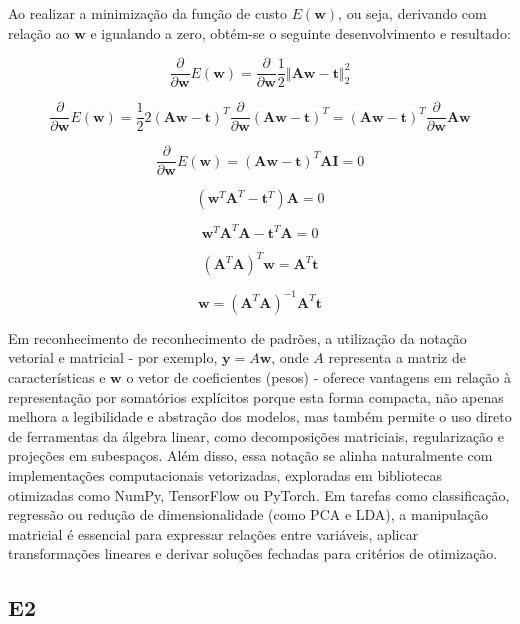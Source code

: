 \documentclass{article}
\begin{document}
  Ao realizar a minimização da função de custo $E(\mathbf{w})$, ou seja, derivando com relação ao $\mathbf{w}$ e igualando a zero, obtém-se o seguinte desenvolvimento e resultado:
  
  \[
   \frac{\partial}{\partial \mathbf{w}} E(\mathbf{w}) =  \frac{\partial}{\partial \mathbf{w}}\frac{1}{2}  \left\Vert  \mathbf{A} \mathbf{w} -\mathbf{t}\right\Vert _{2}^{2}
  \]
  
   \[
  \frac{\partial}{\partial \mathbf{w}} E(\mathbf{w}) =  \frac{1}{2} 2 \left( \mathbf{A} \mathbf{w} -\mathbf{t} \right)^{T} \frac{\partial}{\partial \mathbf{w}} \left(\mathbf{A} \mathbf{w} -\mathbf{t}\right)^{T} = \left( \mathbf{A} \mathbf{w} -\mathbf{t} \right)^{T} \frac{\partial}{\partial \mathbf{w}}\mathbf{A} \mathbf{w}
  \]
  
  \[
  \frac{\partial}{\partial \mathbf{w}} E(\mathbf{w}) =   \left( \mathbf{A} \mathbf{w} -\mathbf{t} \right)^{T} \mathbf{A} \mathbf{I} = 0
  \]
  
  
  \[
   \left( \mathbf{w}^{T} \mathbf{A}^{T}  -\mathbf{t}^{T} \right) \mathbf{A} = 0
  \]
  
  \[
    \mathbf{w}^{T} \mathbf{A}^{T}\mathbf{A}   -\mathbf{t}^{T}\mathbf{A}  = 0
  \]
    
   \[
    (\mathbf{A}^{T}\mathbf{A})^{T}\mathbf{w}   = \mathbf{A}^{T}\mathbf{t} 
   \]
    
   \[
   \mathbf{w} =  (\mathbf{A}^{T}\mathbf{A})^{-1} \mathbf{A}^{T}\mathbf{t} 
  \]
  
  Em reconhecimento de reconhecimento de padrões, a utilização da notação vetorial e matricial - por exemplo, $\mathbf{y}=A\mathbf{w}$, onde $A$ representa a matriz de características e $\mathbf{w}$ o vetor de coeficientes (pesos) - oferece vantagens  em relação à representação por somatórios explícitos porque esta forma compacta, não apenas melhora a legibilidade e abstração dos modelos, mas também permite o uso direto de ferramentas da álgebra linear, como decomposições matriciais, regularização e projeções em subespaços. Além disso, essa notação se alinha naturalmente com implementações computacionais vetorizadas, exploradas em bibliotecas otimizadas como NumPy, TensorFlow ou PyTorch. Em tarefas como classificação, regressão ou redução de dimensionalidade (como PCA e LDA), a manipulação matricial é essencial para expressar relações entre variáveis, aplicar transformações lineares e derivar soluções fechadas para critérios de otimização.
  

\subsection{E2}
\end{document}
